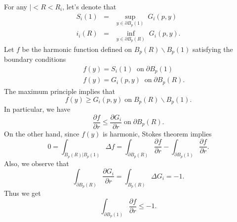 For any $ |< R< R_i $, let's denote that 
\begin{eqnarray*}
S_i(1) & = & \sup_{y 
\in \partial B_{p}(1)} \; G_i (p, y) \\
i_i(R) & = & \inf_{y 
\in \partial B_{p}(R)} \; G_i (p, y)  .
\end{eqnarray*}
Let $f$ be the harmonic function defined on $ B_p (R) \backslash B_p (1) $ satisfying the boundary conditions
%
\begin{eqnarray*} &&f(y) = S_i (1) \; \;\mbox{on}\; \partial B_p(1) \\
&&f(y) = G_i (p, y) \;\;\mbox{on}\; \partial B_p(R) .
\end{eqnarray*}
The maximum principle implies that 
%
\[ f (y) \geq G_i (p, y) \;\mbox{on} \; B_p (R) \backslash B_p (1) .\]
In particular, we have 
%
\[ \frac{\partial f}{\partial r} \leq \frac{\partial G_i}{\partial r} \; \mbox{on}\; \partial B_p (R) .\]
%
On the other hand, since $ f(y)$ is harmonic, Stokes theorem implies 
%
\[ 0 = \int _{B_{p} (R) | B_{p} (1) } \Delta f = \int _{\partial B_{p} (R)} \frac{\partial f}{\partial r} - 
\int _{\partial B_{p} (1)}\frac{\partial f}{\partial r}.\]
%
Also, we observe that 
\[\int _{\partial B_{p} (R)}  \frac{\partial G_{i}}{\partial r} = \int _{ B_{p} (R)}  \Delta G_i = - 1 .\]
%
Thus we get 
%
\[ \int _{\partial B_{p} (1)}  \frac{\partial f}{\partial r} \leq - 1 .\]

